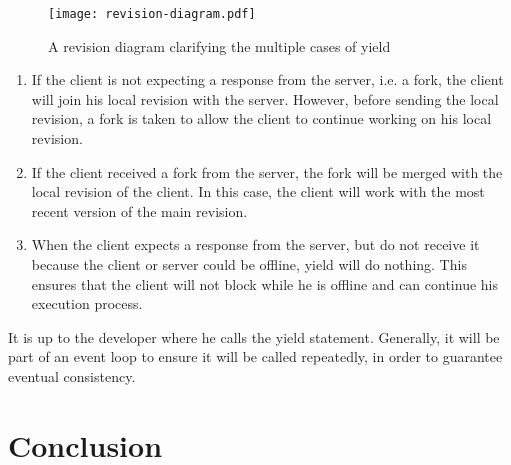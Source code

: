 \documentclass[a4paper,12pt]{report}
\begin{document}
\begin{figure}
    \vspace{-2,5cm}
    \small
    \centering
    \texttt{[image: revision-diagram.pdf]}
    \caption{A revision diagram clarifying the multiple cases of yield}
    \label{fig:revisiondiagram}
\end{figure}

\begin{enumerate}
    \item If the client is not expecting a response from the server, i.e. a fork, the client will join his local revision with the server. However, before sending the local revision, a fork is taken to allow the client to continue working on his local revision.
    \item If the client received a fork from the server, the fork will be merged with the local revision of the client. In this case, the client will work with the most recent version of the main revision.
    \item When the client expects a response from the server, but do not receive it because the client or server could be offline, yield will do nothing. This ensures that the client will not block while he is offline and can continue his execution process.
\end{enumerate}

It is up to the developer where he calls the yield statement. Generally, it will be part of an event loop to ensure it will be called repeatedly, in order to guarantee eventual consistency.

\chapter{Conclusion}\label{cha:Conclusion} %
\end{document}
